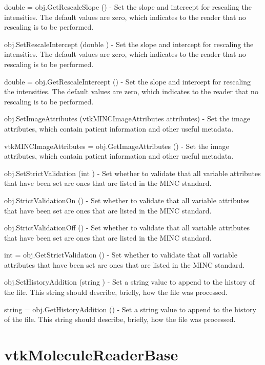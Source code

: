 \begin{DoxyItemize}
\item {\ttfamily double = obj.\-Get\-Rescale\-Slope ()} -\/ Set the slope and intercept for rescaling the intensities. The default values are zero, which indicates to the reader that no rescaling is to be performed.  
\item {\ttfamily obj.\-Set\-Rescale\-Intercept (double )} -\/ Set the slope and intercept for rescaling the intensities. The default values are zero, which indicates to the reader that no rescaling is to be performed.  
\item {\ttfamily double = obj.\-Get\-Rescale\-Intercept ()} -\/ Set the slope and intercept for rescaling the intensities. The default values are zero, which indicates to the reader that no rescaling is to be performed.  
\item {\ttfamily obj.\-Set\-Image\-Attributes (vtk\-M\-I\-N\-C\-Image\-Attributes attributes)} -\/ Set the image attributes, which contain patient information and other useful metadata.  
\item {\ttfamily vtk\-M\-I\-N\-C\-Image\-Attributes = obj.\-Get\-Image\-Attributes ()} -\/ Set the image attributes, which contain patient information and other useful metadata.  
\item {\ttfamily obj.\-Set\-Strict\-Validation (int )} -\/ Set whether to validate that all variable attributes that have been set are ones that are listed in the M\-I\-N\-C standard.  
\item {\ttfamily obj.\-Strict\-Validation\-On ()} -\/ Set whether to validate that all variable attributes that have been set are ones that are listed in the M\-I\-N\-C standard.  
\item {\ttfamily obj.\-Strict\-Validation\-Off ()} -\/ Set whether to validate that all variable attributes that have been set are ones that are listed in the M\-I\-N\-C standard.  
\item {\ttfamily int = obj.\-Get\-Strict\-Validation ()} -\/ Set whether to validate that all variable attributes that have been set are ones that are listed in the M\-I\-N\-C standard.  
\item {\ttfamily obj.\-Set\-History\-Addition (string )} -\/ Set a string value to append to the history of the file. This string should describe, briefly, how the file was processed.  
\item {\ttfamily string = obj.\-Get\-History\-Addition ()} -\/ Set a string value to append to the history of the file. This string should describe, briefly, how the file was processed.  
\end{DoxyItemize}\hypertarget{vtkio_vtkmoleculereaderbase}{}\section{vtk\-Molecule\-Reader\-Base}\label{vtkio_vtkmoleculereaderbase}
